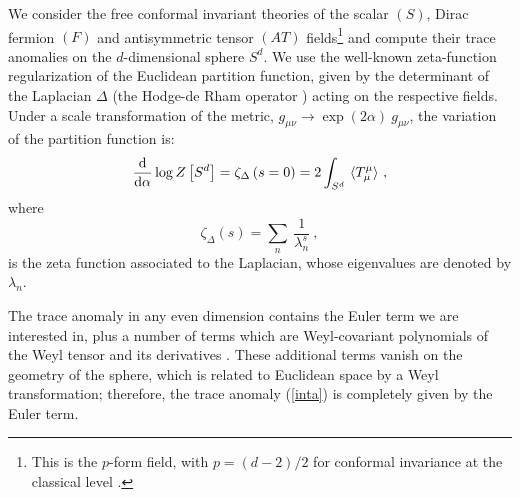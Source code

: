 \documentclass[proceedings]{JHEP}
\newcommand{\beq}{\begin{equation}}
\newcommand{\eeq}{\end{equation}}
\def\a{\alpha}
\def\l{\lambda}
\def\bra{\langle}
\def\ket{\rangle}
\begin{document}
We consider the free conformal invariant theories of the scalar
$(S)$, Dirac fermion $(F)$ and antisymmetric tensor
$(AT)$ fields\footnote{This is the $p$-form field,
with $p=(d-2)/2$ for conformal invariance at the 
classical level \cite{ad}.} and compute their trace
anomalies on the $d$-dimensional sphere $S^d$. 
We use the well-known zeta-function regularization of the 
Euclidean partition function, given by the determinant of 
the Laplacian $\Delta$ (the Hodge-de Rham operator \cite{ad}) 
acting on the respective fields.
Under a scale transformation of the metric,
$g_{\mu\nu} \to \exp(2\a)\  g_{\mu\nu}$,
the variation of the partition function is:
\beq
\frac{\rm d}{{\rm d}\a} \log Z\left[ S^d \right] =
\zeta_{\Delta}\left(s=0\right) 
= 2\int_{S^d}\ \bra T_\mu^\mu \ket\ ,
\label{inta}\eeq
where
\beq
\zeta_{\Delta}\left(s\right) = \sum_n\ \frac{1}{\l^s_n}\ ,
\label{z-fun}\eeq
is the zeta function associated to the Laplacian, whose
eigenvalues are denoted by $\l_n$. 


The trace anomaly in any even dimension contains
the Euler term we are interested in, plus a number
of terms which are Weyl-covariant polynomials of the
Weyl tensor and its derivatives \cite{ds}.
These additional terms vanish on the geometry of
the sphere, which is related to Euclidean space
by a Weyl transformation; therefore, the trace
anomaly (\ref{inta}) is completely given by
the Euler term.
\end{document}
